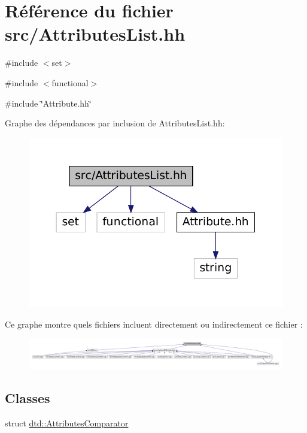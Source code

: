 \hypertarget{_attributes_list_8hh}{
\section{Référence du fichier src/AttributesList.hh}
\label{_attributes_list_8hh}
}
{\ttfamily \#include $<$set$>$}\par
{\ttfamily \#include $<$functional$>$}\par
{\ttfamily \#include \char`\"{}Attribute.hh\char`\"{}}\par
Graphe des dépendances par inclusion de AttributesList.hh:\nopagebreak
\begin{figure}[H]
\begin{center}
\leavevmode
\includegraphics[width=362pt]{_attributes_list_8hh__incl}
\end{center}
\end{figure}
Ce graphe montre quels fichiers incluent directement ou indirectement ce fichier :\nopagebreak
\begin{figure}[H]
\begin{center}
\leavevmode
\includegraphics[width=400pt]{_attributes_list_8hh__dep__incl}
\end{center}
\end{figure}
\subsection*{Classes}
\begin{DoxyCompactItemize}
\item 
struct \hyperlink{structdtd_1_1_attributes_comparator}{dtd::AttributesComparator}
\end{DoxyCompactItemize}
